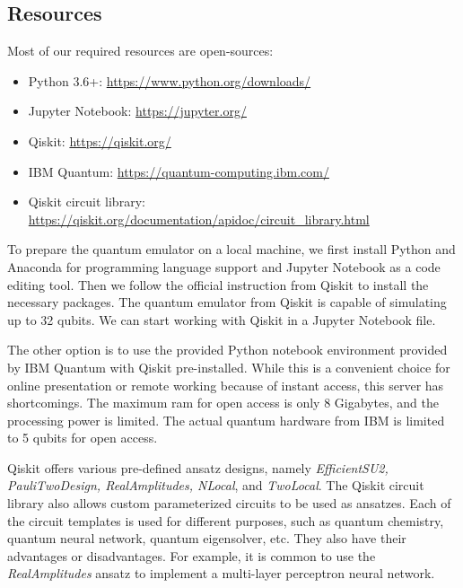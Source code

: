 \subsection{Resources} \label{Resources section}
Most of our required resources are open-sources:
\begin{itemize}
    \item Python 3.6+: \url{https://www.python.org/downloads/}
    \item Jupyter Notebook: \url{https://jupyter.org/}
    \item Qiskit: \url{https://qiskit.org/}
    \item IBM Quantum: \url{https://quantum-computing.ibm.com/}
    \item Qiskit circuit library: \url{https://qiskit.org/documentation/apidoc/circuit_library.html}
\end{itemize}

To prepare the quantum emulator on a local machine, we first install Python and Anaconda for programming language support and Jupyter Notebook as a code editing tool.
Then we follow the official instruction from Qiskit \cite{Qiskit} to install the necessary packages.
The quantum emulator from Qiskit is capable of simulating up to 32 qubits.
We can start working with Qiskit in a Jupyter Notebook file.

The other option is to use the provided Python notebook environment provided by IBM Quantum with Qiskit pre-installed.
While this is a convenient choice for online presentation or remote working because of instant access, this server has shortcomings.
The maximum ram for open access is only 8 Gigabytes, and the processing power is limited.
The actual quantum hardware from IBM is limited to 5 qubits for open access.

Qiskit offers various pre-defined ansatz designs, namely \textit{EfficientSU2, PauliTwoDesign, RealAmplitudes, NLocal}, and \textit{TwoLocal}.
The Qiskit circuit library also allows custom parameterized circuits to be used as ansatzes.
Each of the circuit templates is used for different purposes, such as quantum chemistry, quantum neural network, quantum eigensolver, etc.
They also have their advantages or disadvantages.
For example, it is common to use the \textit{RealAmplitudes} ansatz to implement a multi-layer perceptron neural network.